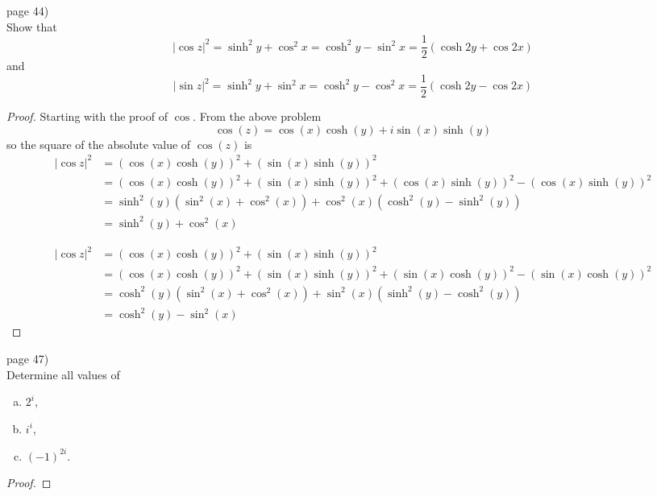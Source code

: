 \documentclass{article}
\newenvironment{problem}[2][Problem]{\begin{trivlist}
\item[\hskip \labelsep {\bfseries #1}\hskip \labelsep {\bfseries #2.}]}{\end{trivlist}}
\begin{document}
\begin{problem}{4} (page 44) \\
  Show that \[
    |\cos z|^2
    = \sinh^2 y + \cos^2 x
    = \cosh^2 y - \sin^2 x
    = \frac{1}{2}(\cosh 2y + \cos 2x)
  \] and \[
    |\sin z|^2
    = \sinh^2 y + \sin^2 x
    = \cosh^2 y - \cos^2 x
    = \frac{1}{2}(\cosh 2y - \cos 2x)
  \]
\end{problem}

\begin{proof}
  Starting with the proof of $\cos$. From the above problem \[
    \cos(z) = \cos(x)\cosh(y) + i\sin(x)\sinh(y)
  \] so the square of the absolute value of $\cos(z)$ is \begin{align*}
    |\cos z|^2 &= (\cos(x)\cosh(y))^2 + (\sin(x)\sinh(y))^2 \\
    &= (\cos(x)\cosh(y))^2 + (\sin(x)\sinh(y))^2 + (\cos(x)\sinh(y))^2 - (\cos(x)\sinh(y))^2\\
    &= \sinh^2(y)(\sin^2(x) + \cos^2(x)) + \cos^2(x)(\cosh^2(y)-\sinh^2(y)) \\
    &= \sinh^2(y) + \cos^2(x)
  \end{align*}

  \begin{align*}
    |\cos z|^2 &= (\cos(x)\cosh(y))^2 + (\sin(x)\sinh(y))^2 \\
    &= (\cos(x)\cosh(y))^2 + (\sin(x)\sinh(y))^2 + (\sin(x)\cosh(y))^2 - (\sin(x)\cosh(y))^2\\
    &= \cosh^2(y)(\sin^2(x) + \cos^2(x)) + \sin^2(x)(\sinh^2(y)-\cosh^2(y)) \\
    &= \cosh^2(y) - \sin^2(x)
  \end{align*}
\end{proof}

\pagebreak

\begin{problem}{6} (page 47) \\
  Determine all values of \begin{enumerate}[(a)]
    \item $2^i$,
    \item $i^i$,
    \item $(-1)^{2i}$.
  \end{enumerate}
\end{problem}

\begin{proof}
\end{proof}
\end{document}
